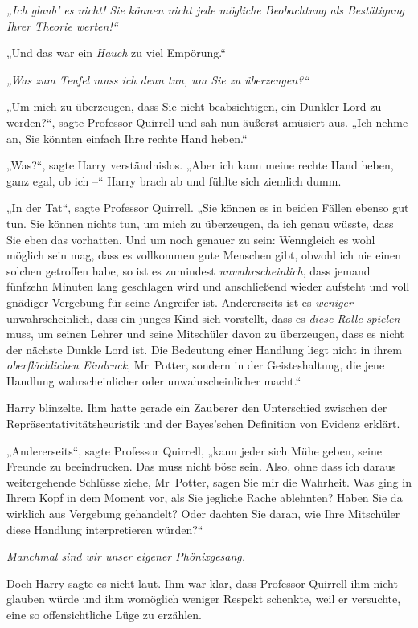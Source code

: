{\emph{„Ich glaub' es nicht! Sie können nicht jede mögliche Beobachtung als Bestätigung Ihrer Theorie werten!“}

„Und das war ein \emph{Hauch} zu viel Empörung.“

\emph{„Was zum Teufel muss ich denn tun, um Sie zu überzeugen?“}

„Um mich zu überzeugen, dass Sie nicht beabsichtigen, ein Dunkler Lord zu werden?“, sagte Professor Quirrell und sah nun äußerst amüsiert aus. „Ich nehme an, Sie könnten einfach Ihre rechte Hand heben.“

„Was?“, sagte Harry verständnislos. „Aber ich kann meine rechte Hand heben, ganz egal, ob ich --“ Harry brach ab und fühlte sich ziemlich dumm.

„In der Tat“, sagte Professor Quirrell. „Sie können es in beiden Fällen ebenso gut tun. Sie können nichts tun, um mich zu überzeugen, da ich genau wüsste, dass Sie eben das vorhatten. Und um noch genauer zu sein: Wenngleich es wohl möglich sein mag, dass es vollkommen gute Menschen gibt, obwohl ich nie einen solchen getroffen habe, so ist es zumindest \emph{unwahrscheinlich}, dass jemand fünfzehn Minuten lang geschlagen wird und anschließend wieder aufsteht und voll gnädiger Vergebung für seine Angreifer ist. Andererseits ist es \emph{weniger} unwahrscheinlich, dass ein junges Kind sich vorstellt, dass es \emph{diese Rolle spielen} muss, um seinen Lehrer und seine Mitschüler davon zu überzeugen, dass es nicht der nächste Dunkle Lord ist. Die Bedeutung einer Handlung liegt nicht in ihrem \emph{oberflächlichen Eindruck}, Mr~Potter, sondern in der Geisteshaltung, die jene Handlung wahrscheinlicher oder unwahrscheinlicher macht.“

Harry blinzelte. Ihm hatte gerade ein Zauberer den Unterschied zwischen der Repräsentativitätsheuristik und der Bayes'schen Definition von Evidenz erklärt.

„Andererseits“, sagte Professor Quirrell, „kann jeder sich Mühe geben, seine Freunde zu beeindrucken. Das muss nicht böse sein. Also, ohne dass ich daraus weitergehende Schlüsse ziehe, Mr~Potter, sagen Sie mir die Wahrheit. Was ging in Ihrem Kopf in dem Moment vor, als Sie jegliche Rache ablehnten? Haben Sie da wirklich aus Vergebung gehandelt? Oder dachten Sie daran, wie Ihre Mitschüler diese Handlung interpretieren würden?“

\emph{Manchmal sind wir unser eigener Phönixgesang.}

Doch Harry sagte es nicht laut. Ihm war klar, dass Professor Quirrell ihm nicht glauben würde und ihm womöglich weniger Respekt schenkte, weil er versuchte, eine so offensichtliche Lüge zu erzählen.

}

